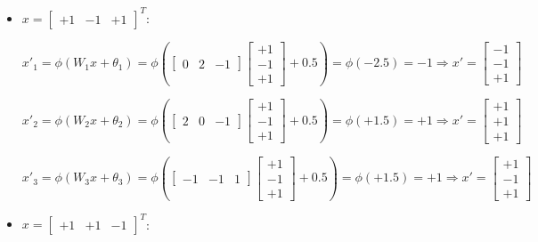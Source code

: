 \documentclass[letterpaper,headings=standardclasses]{scrartcl}
\begin{document}
\begin{itemize}
\item $x = [\begin{matrix} +1 & -1 & +1 \end{matrix}]^T$:

$$ x'_{1} = \phi(W_1 x + \theta_1) = \phi \left( \left[ \begin{matrix} 0 & 2 & -1 \end{matrix} \right] \left[ \begin{matrix} +1 \\ -1 \\ +1 \end{matrix} \right] + 0.5 \right) = \phi \left( -2.5 \right) = -1 \Rightarrow x' = \left[ \begin{matrix} -1 \\ -1 \\ +1 \end{matrix} \right] $$

$$ x'_{2} = \phi(W_2 x + \theta_2) = \phi \left( \left[ \begin{matrix} 2 & 0 & -1 \end{matrix} \right] \left[ \begin{matrix} +1 \\ -1 \\ +1 \end{matrix} \right] + 0.5 \right) = \phi \left( +1.5 \right) = +1 \Rightarrow x' = \left[ \begin{matrix} +1 \\ +1 \\ +1 \end{matrix} \right] $$

$$ x'_{3} = \phi(W_3 x + \theta_3) = \phi \left( \left[ \begin{matrix} -1 & -1 & 1 \end{matrix} \right] \left[ \begin{matrix} +1 \\ -1 \\ +1 \end{matrix} \right] + 0.5 \right) = \phi \left( +1.5 \right) = +1 \Rightarrow x' = \left[ \begin{matrix} +1 \\ -1 \\ +1 \end{matrix} \right] $$

\item $x = [\begin{matrix} +1 & +1 & -1 \end{matrix}]^T$:


\end{itemize}
\end{document}
